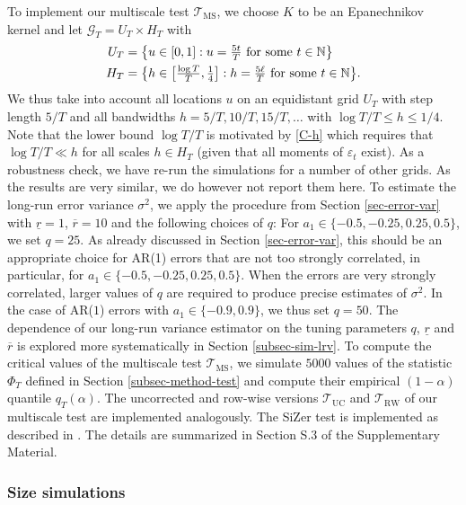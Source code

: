 To implement our multiscale test $\mathcal{T}_{\text{MS}}$, we choose $K$ to be an Epanechnikov kernel and let $\mathcal{G}_T = U_T \times H_T$ with 
\begin{align*}
U_T & = \big\{ u \in [0,1]: u = \textstyle{\frac{5t}{T}} \text{ for some } t \in \mathbb{N} \big\} \\
H_T & = \big\{ h \in \big[ \textstyle{\frac{\log T}{T}}, \textstyle{\frac{1}{4}} \big]:  h = \textstyle{\frac{5\ell}{T}} \text{ for some } t \in \mathbb{N} \big\}. 
\end{align*}
We thus take into account all locations $u$ on an equidistant grid $U_T$ with step length $5/T$ and all bandwidths $h=5/T, 10/T, 15/T,\ldots$ with $\log T /T \le h \le 1/4$. Note that the lower bound $\log T / T$ is motivated by \ref{C-h} which requires that $\log T /T \ll h$ for all scales $h \in H_T$ (given that all moments of $\varepsilon_t$ exist). As a robustness check, we have re-run the simulations for a number of other grids. As the results are very similar, we do however not report them here. 
To estimate the long-run error variance $\sigma^2$, we apply the procedure from Section \ref{sec-error-var} with $\underline{r}=1$, $\overline{r}=10$ and the following choices of $q$: For $a_1 \in \{-0.5,-0.25,0.25,0.5\}$, we set $q = 25$. As already discussed in Section \ref{sec-error-var}, this should be an appropriate choice for AR(1) errors that are not too strongly correlated, in particular, for $a_1 \in \{-0.5,-0.25,0.25,0.5\}$. When the errors are very strongly correlated, larger values of $q$ are required to produce precise estimates of $\sigma^2$. In the case of AR($1$) errors with $a_1 \in \{-0.9,0.9\}$, we thus set $q = 50$. The dependence of our long-run variance estimator on the tuning parameters $q$, $\underline{r}$ and $\overline{r}$ is explored more systematically in Section \ref{subsec-sim-lrv}. 
To compute the critical values of the multiscale test $\mathcal{T}_{\text{MS}}$, we simulate $5000$ values of the statistic $\Phi_T$ defined in Section \ref{subsec-method-test} and compute their empirical $(1-\alpha)$ quantile $q_T(\alpha)$. The uncorrected and row-wise versions $\mathcal{T}_{\text{UC}}$ and $\mathcal{T}_{\text{RW}}$ of our multiscale test are implemented analogously. The SiZer test is implemented as described in \cite{ParkHannigKang2009}. The details are summarized in Section S.3 of the Supplementary Material. 


\subsubsection{Size simulations}\label{subsec-sim-multiscale-size} 


